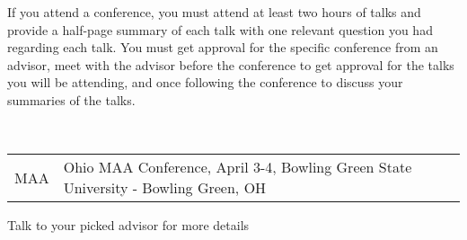 \documentclass[11pt]{article}
\begin{document}
\flushleft

If you attend a conference, you must attend at least two hours of talks and provide a half-page summary of each talk with one relevant question you had regarding each talk. You must get approval for the specific conference from an advisor, meet with the advisor before the conference to get approval for the talks you will be attending, and once following the conference to discuss your summaries of the talks. 

\FL
{}
\\

\begin{tabular}{@{}ll}
MAA & Ohio MAA Conference,  April 3-4, Bowling Green State University - Bowling Green, OH\\
\end{tabular}

Talk to your picked advisor for more details
\end{document}

